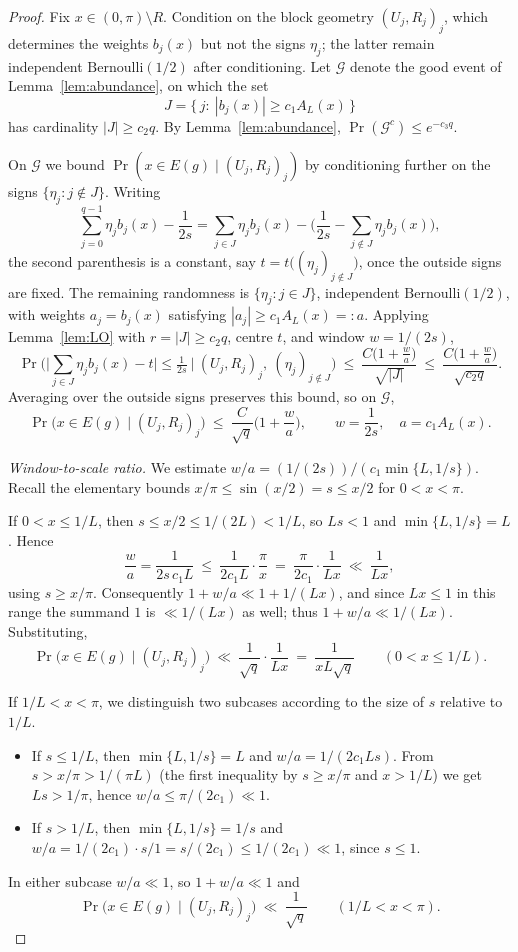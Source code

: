 \documentclass[11pt,reqno]{amsart}
\theoremstyle{plain}
\theoremstyle{definition}
\theoremstyle{remark}
\begin{document}
\begin{proof}
Fix $x\in(0,\pi)\setminus R$. Condition on the block geometry $(U_j,R_j)_{j}$, which determines the weights $b_j(x)$ but not the signs $\eta_j$; the latter remain independent $\mathrm{Bernoulli}(1/2)$ after conditioning. Let $\mathcal{G}$ denote the good event of Lemma~\ref{lem:abundance}, on which the set
\[
J=\{\,j:\ |b_j(x)|\ge c_1 A_L(x)\,\}
\]
has cardinality $|J|\ge c_2 q$. By Lemma~\ref{lem:abundance}, $\Pr(\mathcal{G}^c)\le e^{-c_3 q}$.

On $\mathcal{G}$ we bound $\Pr(x\in E(g)\mid(U_j,R_j)_j)$ by conditioning further on the signs $\{\eta_j:j\notin J\}$. Writing
\[
\sum_{j=0}^{q-1}\eta_j b_j(x)-\frac1{2s}
=\sum_{j\in J}\eta_j b_j(x)-\Big(\frac1{2s}-\sum_{j\notin J}\eta_j b_j(x)\Big),
\]
the second parenthesis is a constant, say $t=t\big((\eta_j)_{j\notin J}\big)$, once the outside signs are fixed. The remaining randomness is $\{\eta_j:j\in J\}$, independent $\mathrm{Bernoulli}(1/2)$, with weights $a_j=b_j(x)$ satisfying $|a_j|\ge c_1 A_L(x)=:a$. Applying Lemma~\ref{lem:LO} with $r=|J|\ge c_2 q$, centre $t$, and window $w=1/(2s)$,
\[
\Pr\Big(\Big|\sum_{j\in J}\eta_j b_j(x)-t\Big|\le \tfrac1{2s}\ \Big|\ (U_j,R_j)_j,\ (\eta_j)_{j\notin J}\Big)
\ \le\ \frac{C\big(1+\tfrac{w}{a}\big)}{\sqrt{|J|}}
\ \le\ \frac{C\big(1+\tfrac{w}{a}\big)}{\sqrt{c_2 q}} .
\]
Averaging over the outside signs preserves this bound, so on $\mathcal G$,
\[
\Pr\big(x\in E(g)\mid (U_j,R_j)_j\big)\ \le\ \frac{C}{\sqrt q}\Big(1+\frac{w}{a}\Big),
\qquad w=\frac1{2s},\quad a=c_1 A_L(x).
\]

\emph{Window-to-scale ratio.} We estimate $w/a=(1/(2s))/(c_1\min\{L,1/s\})$. Recall the elementary bounds $x/\pi\le\sin(x/2)=s\le x/2$ for $0<x<\pi$.

If $0<x\le 1/L$, then $s\le x/2\le 1/(2L)<1/L$, so $Ls<1$ and $\min\{L,1/s\}=L$. Hence
\[
\frac{w}{a}=\frac{1}{2s\,c_1 L}\ \le\ \frac{1}{2c_1 L}\cdot\frac{\pi}{x}\ =\ \frac{\pi}{2c_1}\cdot\frac{1}{Lx}\ \ll\ \frac{1}{Lx},
\]
using $s\ge x/\pi$. Consequently $1+w/a\ll 1+1/(Lx)$, and since $Lx\le1$ in this range the summand $1$ is $\ll 1/(Lx)$ as well; thus $1+w/a\ll 1/(Lx)$. Substituting,
\[
\Pr\big(x\in E(g)\mid(U_j,R_j)_j\big)\ \ll\ \frac{1}{\sqrt q}\cdot\frac{1}{Lx}\ =\ \frac{1}{xL\sqrt q}
\qquad(0<x\le 1/L).
\]

If $1/L<x<\pi$, we distinguish two subcases according to the size of $s$ relative to $1/L$.
\begin{itemize}
\item If $s\le 1/L$, then $\min\{L,1/s\}=L$ and $w/a=1/(2c_1 Ls)$. From $s>x/\pi>1/(\pi L)$ (the first inequality by $s\ge x/\pi$ and $x>1/L$) we get $Ls>1/\pi$, hence $w/a\le \pi/(2c_1)\ll1$.
\item If $s>1/L$, then $\min\{L,1/s\}=1/s$ and $w/a=1/(2c_1)\cdot s/1=s/(2c_1)\le 1/(2c_1)\ll1$, since $s\le1$.
\end{itemize}
In either subcase $w/a\ll1$, so $1+w/a\ll1$ and
\[
\Pr\big(x\in E(g)\mid(U_j,R_j)_j\big)\ \ll\ \frac{1}{\sqrt q}
\qquad(1/L<x<\pi).
\]


\end{proof}
\end{document}

